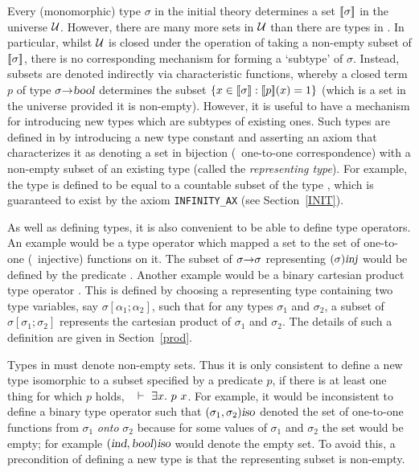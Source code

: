 Every (monomorphic) type $\sigma$ in the initial theory 
determines a set $[\![\sigma]\!]$ in the universe $\cal U$. However,
there are many more sets in $\cal U$ than there are types in
.  In particular, whilst $\cal U$ is closed under the
operation of taking a non-empty subset of $[\![\sigma]\!]$, there is no
corresponding mechanism for forming a `subtype' of $\sigma$. Instead,
subsets are denoted indirectly via characteristic functions, whereby a
closed term $p$ of type $\sigma{\to}\textsl{bool}$ determines the subset
$\{x\in[\![\sigma]\!] : [\![p]\!](x)=1\}$ (which is a set in the universe
provided it is non-empty).  However, it is useful to have a
mechanism for introducing new types which are subtypes of existing
ones. Such types are defined in \HOL{} by introducing a new type
constant and asserting an axiom that characterizes it as denoting a
set in bijection (\ie\ one-to-one correspondence) with a non-empty
subset of an existing type (called the {\it representing type\/}).
For example, the type  is defined to be equal to a countable
subset of the type , which is guaranteed to exist by the axiom
{\small\tt INFINITY\_AX} (see Section~\ref{INIT}).

As well as defining types, it is also convenient to be able to define
type operators.  An example would be a type operator  which
mapped a set to the set of one-to-one (\ie\ injective) functions on
it.  The subset of $\sigma{\to}\sigma$ representing $(\sigma)\textsl{inj}$
would be defined by the predicate \OneOne.  Another example would be a
binary cartesian product type operator .  This is defined by
choosing a representing type containing two type variables, say
$\sigma[\alpha_1;\alpha_2]$, such that for any types $\sigma_1$ and
$\sigma_2$, a subset of $\sigma[\sigma_1;\sigma_2]$ represents the
cartesian product of $\sigma_1$ and $\sigma_2$.  The details of such a
definition are given in Section~\ref{prod}.

Types in \HOL{} must denote non-empty sets.  Thus it is only
consistent to define a new type isomorphic to a
subset specified by a predicate $p$, if there is at least one thing
for which $p$ holds, \ie\ $\ \vdash\ \exists x.\ p\ x$.  For example, it
would be inconsistent to define a binary type operator  such
that $(\sigma_1,\sigma_2)\textsl{iso}$ denoted the set of one-to-one
functions from $\sigma_1$ {\em onto\/} $\sigma_2$ because for some
values of $\sigma_1$ and $\sigma_2$ the set would be empty; for
example $(\textsl{ind},\textsl{bool})\textsl{iso}$ would denote the empty set.  To
avoid this, a precondition of defining a new type is that the
representing subset is non-empty.

